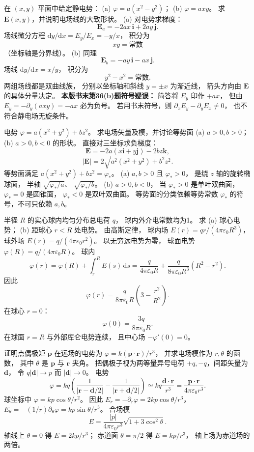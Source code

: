 在 $(x,y)$ 平面中给定静电势：
(a) $\varphi=a(x^2-y^2)$；
(b) $\varphi=axy$。
求 $\bm E(x,y)$，并说明电场线的大致形状。
\exsolution
(a) 对电势求梯度：
\[
\boxed{\bm E_a=
-2ax\,\bm i+2ay\,\bm j}.
\]
场线微分方程
$\mathrm dy/\mathrm dx=E_y/E_x=-y/x$，
积分为
\[
\boxed{xy=\text{常数}}
\]
（坐标轴是分界线）。
(b) 同理
\[
\boxed{\bm E_b=-ay\,\bm i-ax\,\bm j}.
\]
场线
$\mathrm dy/\mathrm dx=x/y$，
积分为
\[
\boxed{y^2-x^2=\text{常数}}.
\]
两组场线都是双曲线族，
分别以坐标轴和斜线 $y=\pm x$ 为渐近线，
箭头方向由 $\bm E$ 的具体分量决定。
\excheck \textbf{本版书末第36(b)题符号疑误：}
简答将 $E_y$ 印作 $+ax$，
但由 $E_y=-\partial_y(axy)=-ax$ 必为负号。
若用书末符号，则
$\partial_xE_y-\partial_yE_x\ne0$，
也不符合静电场无旋条件。

电势
$\varphi=a(x^2+y^2)+bz^2$。
求电场矢量及模，并讨论等势面
(a) $a>0,b>0$；
(b) $a>0,b<0$ 的形状。
\exsolution
直接对三坐标求负梯度：
\[
\boxed{\bm E=
-2a(x\bm i+y\bm j)-2bz\bm k},
\]
\[
\boxed{|\bm E|=
2\sqrt{a^2(x^2+y^2)+b^2z^2}}.
\]
等势面满足
$a(x^2+y^2)+bz^2=\varphi_*$。
(a) $a,b>0$ 且 $\varphi_*>0$，
是绕 $z$ 轴的旋转椭球面，
半轴 $\sqrt{\varphi_*/a}$、
$\sqrt{\varphi_*/b}$。
(b) $a>0,b<0$，
当 $\varphi_*>0$ 是单叶双曲面，
$\varphi_*=0$ 是圆锥面，
$\varphi_*<0$ 是双叶双曲面。
\excheck 等势面的分类依赖等势常数 $\varphi_*$
的符号，不可只依赖 $a,b$。

半径 $R$ 的实心球内均匀分布总电荷 $q$，
球内外介电常数均为1。
求 (a) 球心电势；
(b) 距球心 $r<R$ 处电势。
\exsolution
由高斯定律，
球内场
$E(r)=qr/(4\pi\varepsilon_0R^3)$，
球外场
$E(r)=q/(4\pi\varepsilon_0r^2)$。
以无穷远电势为零，
球面电势
$\varphi(R)=q/(4\pi\varepsilon_0R)$。
球内
\[
\varphi(r)=\varphi(R)+\int_r^R E(s)\,\mathrm ds
=\frac{q}{4\pi\varepsilon_0R}
+\frac{q}{8\pi\varepsilon_0R^3}(R^2-r^2).
\]
因此
\[
\boxed{\varphi(r)=
\frac{q}{8\pi\varepsilon_0R}
\left(3-\frac{r^2}{R^2}\right)}.
\]
在球心 $r=0$：
\[
\boxed{\varphi(0)=\frac{3q}{8\pi\varepsilon_0R}}.
\]
\excheck 在球面 $r=R$ 与外部库仑电势连续，
且中心场 $-\varphi'(0)=0$。

证明点偶极矩 $\bm p$ 在远场的电势为
$\varphi=k(\bm p\cdot\bm r)/r^3$，
并求电场模作为 $r,\theta$ 的函数，
其中 $\theta$ 是 $\bm p$ 与 $\bm r$ 夹角。
\exsolution
把偶极子视为两等量异号电荷
$+q,-q$，间距矢量为 $\bm d$，
令 $q|\bm d|\to p$ 而 $|\bm d|\to0$。
电势
\[
\varphi=kq\left(
\frac1{|\bm r-\bm d/2|}
-\frac1{|\bm r+\bm d/2|}\right)
\simeq kq\frac{\bm d\cdot\bm r}{r^3}
=\boxed{\frac{\bm p\cdot\bm r}
{4\pi\varepsilon_0r^3}}.
\]
球坐标中
$\varphi=kp\cos\theta/r^2$。
因此
$E_r=-\partial_r\varphi
=2kp\cos\theta/r^3$，
$E_\theta=-(1/r)\partial_\theta\varphi
=kp\sin\theta/r^3$。
合场模
\[
\boxed{E=\frac{|p|}{4\pi\varepsilon_0r^3}
\sqrt{1+3\cos^2\theta}}.
\]
\excheck 轴线上 $\theta=0$ 得
$E=2kp/r^3$；
赤道面 $\theta=\pi/2$ 得 $E=kp/r^3$，
轴上场为赤道场的两倍。

